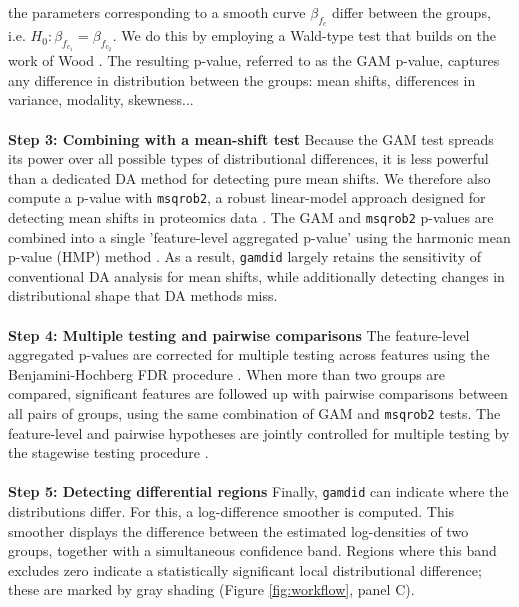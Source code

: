 {the parameters corresponding to a smooth curve $\beta_{f_c}$
differ between the groups, i.e. $H_0: \beta_{f_{c_1}} = \beta_{f_{c_2}}$.
We do this by employing a Wald-type test that builds on the work of Wood \cite{Wald}.
The resulting p-value, referred to as the GAM p-value, captures any difference in
distribution between the groups: mean shifts, differences in variance, modality,
skewness...
\\
\\
\textbf{Step 3: Combining with a mean-shift test}
Because the GAM test spreads its power over all possible types of distributional
differences,
it is less powerful than a dedicated DA method for detecting pure mean shifts.
We therefore also compute a p-value with \texttt{msqrob2}, a robust linear-model
approach designed for detecting mean shifts in proteomics data \cite{msqrob}.
The GAM and
\texttt{msqrob2} p-values are combined into a single 'feature-level aggregated
p-value' using the harmonic mean p-value (HMP) method \cite{harmonicp}.
As a result, \texttt{gamdid} largely retains the
sensitivity of conventional DA analysis for mean shifts, while additionally
detecting changes in distributional shape that DA methods miss.
\\
\\
\textbf{Step 4: Multiple testing and pairwise comparisons}
The feature-level aggregated p-values are corrected for multiple testing across
features using the Benjamini-Hochberg FDR procedure
\cite{BH_procedure}. When more than two groups are compared, significant features
are followed up with pairwise comparisons between all pairs of groups, using the
same combination of GAM and \texttt{msqrob2} tests. The feature-level and pairwise
hypotheses are jointly controlled for multiple testing by the stagewise testing
procedure \cite{stagewise_testing, stager}.
\\
\\
\textbf{Step 5: Detecting differential regions}
Finally, \texttt{gamdid} can indicate where the
distributions differ. For this, a log-difference smoother is computed. This
smoother displays the difference between the estimated log-densities of two
groups, together with a simultaneous confidence band. Regions where this
band excludes zero indicate a statistically significant local distributional
difference; these are marked by gray shading (Figure \ref{fig:workflow}, panel C).
}

